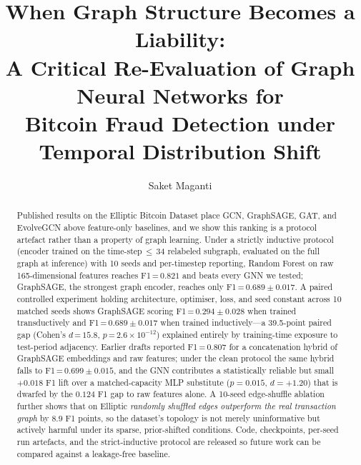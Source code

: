 \documentclass[11pt,a4paper]{article}
\title{When Graph Structure Becomes a Liability:\\
  A Critical Re-Evaluation of Graph Neural Networks for\\
  Bitcoin Fraud Detection under Temporal Distribution Shift}
\author{Saket Maganti}
\date{}
\begin{document}
\maketitle

\begin{abstract}
Published results on the Elliptic Bitcoin Dataset place GCN, GraphSAGE,
GAT, and EvolveGCN above feature-only baselines, and we show this
ranking is a protocol artefact rather than a property of graph
learning.  Under a strictly inductive protocol (encoder trained on
the time-step\,$\le$\,34 relabeled subgraph, evaluated on the full
graph at inference) with 10 seeds and per-timestep reporting, Random
Forest on raw 165-dimensional features reaches F1\,=\,$0.821$ and
beats every GNN we tested; GraphSAGE, the strongest graph encoder,
reaches only F1\,=\,$0.689 \pm 0.017$.  A paired controlled
experiment holding architecture, optimiser, loss, and seed constant
across 10 matched seeds shows GraphSAGE scoring
F1\,=\,$0.294 \pm 0.028$ when trained transductively and
F1\,=\,$0.689 \pm 0.017$ when trained inductively---a 39.5-point
paired gap (Cohen's $d$\,=\,$15.8$, $p$\,=\,$2.6 \times 10^{-12}$)
explained entirely by training-time exposure to test-period
adjacency.  Earlier drafts reported F1\,=\,$0.807$ for a concatenation
hybrid of GraphSAGE embeddings and raw features; under the clean
protocol the same hybrid falls to F1\,=\,$0.699 \pm 0.015$, and the
GNN contributes a statistically reliable but small $+0.018$ F1 lift
over a matched-capacity MLP substitute ($p = 0.015$, $d = +1.20$)
that is dwarfed by the $0.124$ F1 gap to raw features alone.  A
10-seed edge-shuffle ablation further shows that on Elliptic
\emph{randomly shuffled edges outperform the real transaction graph}
by $8.9$ F1 points, so the dataset's topology is not merely
uninformative but actively harmful under its sparse, prior-shifted
conditions.  Code, checkpoints, per-seed run artefacts, and the
strict-inductive protocol are released so future work can be compared
against a leakage-free baseline.
\end{abstract}





\end{document}
